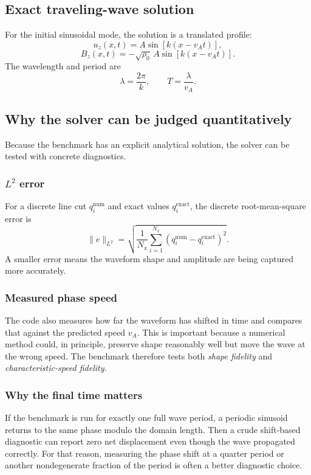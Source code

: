 \documentclass[11pt]{article}
\begin{document}
\subsection{Exact traveling-wave solution}
For the initial sinusoidal mode, the solution is a translated profile:
\begin{equation}
u_z(x,t)=A\sin\left[k(x-v_A t)\right],
\label{eq:m2-exact-uz}
\end{equation}
\begin{equation}
B_z(x,t)=-\sqrt{\rho_0}\,A\sin\left[k(x-v_A t)\right].
\label{eq:m2-exact-bz}
\end{equation}
The wavelength and period are
\begin{equation}
\lambda = \frac{2\pi}{k},
\qquad
T = \frac{\lambda}{v_A}.
\label{eq:m2-lambda-period}
\end{equation}

\subsection{Why the solver can be judged quantitatively}
Because the benchmark has an explicit analytical solution, the solver can be tested with concrete diagnostics.

\subsubsection{$L^2$ error}
For a discrete line cut $q_i^{\text{num}}$ and exact values $q_i^{\text{exact}}$, the discrete root-mean-square error is
\begin{equation}
\|e\|_{L^2}
=
\sqrt{
\frac{1}{N_x}
\sum_{i=1}^{N_x}
\left(q_i^{\text{num}}-q_i^{\text{exact}}\right)^2 }.
\label{eq:m2-l2}
\end{equation}
A smaller error means the waveform shape and amplitude are being captured more accurately.

\subsubsection{Measured phase speed}
The code also measures how far the waveform has shifted in time and compares that against the predicted speed $v_A$. This is important because a numerical method could, in principle, preserve shape reasonably well but move the wave at the wrong speed. The benchmark therefore tests both \emph{shape fidelity} and \emph{characteristic-speed fidelity}.

\subsubsection{Why the final time matters}
If the benchmark is run for exactly one full wave period, a periodic sinusoid returns to the same phase modulo the domain length. Then a crude shift-based diagnostic can report zero net displacement even though the wave propagated correctly. For that reason, measuring the phase shift at a quarter period or another nondegenerate fraction of the period is often a better diagnostic choice.
\end{document}
